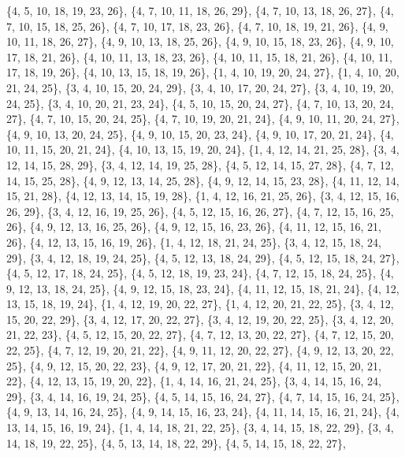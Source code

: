 \documentclass[11pt,a4paper]{article}
\begin{document}
{\{4, 5, 10, 18, 19, 23, 26\}, \{4, 7, 10, 11, 18, 26, 29\}, \{4, 7, 10, 13, 18, 26, 27\}, \{4, 7, 10, 15, 18, 25, 26\}, \{4, 7, 10, 17, 18, 23, 26\},
\{4, 7, 10, 18, 19, 21, 26\}, \{4, 9, 10, 11, 18, 26, 27\}, \{4, 9, 10, 13, 18, 25, 26\}, \{4, 9, 10, 15, 18, 23, 26\}, \{4, 9, 10, 17, 18, 21, 26\},
\{4, 10, 11, 13, 18, 23, 26\}, \{4, 10, 11, 15, 18, 21, 26\}, \{4, 10, 11, 17, 18, 19, 26\}, \{4, 10, 13, 15, 18, 19, 26\}, \{1, 4, 10, 19, 20, 24, 27\},
\{1, 4, 10, 20, 21, 24, 25\}, \{3, 4, 10, 15, 20, 24, 29\}, \{3, 4, 10, 17, 20, 24, 27\}, \{3, 4, 10, 19, 20, 24, 25\}, \{3, 4, 10, 20, 21, 23, 24\},
\{4, 5, 10, 15, 20, 24, 27\}, \{4, 7, 10, 13, 20, 24, 27\}, \{4, 7, 10, 15, 20, 24, 25\}, \{4, 7, 10, 19, 20, 21, 24\}, \{4, 9, 10, 11, 20, 24, 27\},
\{4, 9, 10, 13, 20, 24, 25\}, \{4, 9, 10, 15, 20, 23, 24\}, \{4, 9, 10, 17, 20, 21, 24\}, \{4, 10, 11, 15, 20, 21, 24\}, \{4, 10, 13, 15, 19, 20, 24\},
\{1, 4, 12, 14, 21, 25, 28\}, \{3, 4, 12, 14, 15, 28, 29\}, \{3, 4, 12, 14, 19, 25, 28\}, \{4, 5, 12, 14, 15, 27, 28\}, \{4, 7, 12, 14, 15, 25, 28\},
\{4, 9, 12, 13, 14, 25, 28\}, \{4, 9, 12, 14, 15, 23, 28\}, \{4, 11, 12, 14, 15, 21, 28\}, \{4, 12, 13, 14, 15, 19, 28\}, \{1, 4, 12, 16, 21, 25, 26\},
\{3, 4, 12, 15, 16, 26, 29\}, \{3, 4, 12, 16, 19, 25, 26\}, \{4, 5, 12, 15, 16, 26, 27\}, \{4, 7, 12, 15, 16, 25, 26\}, \{4, 9, 12, 13, 16, 25, 26\},
\{4, 9, 12, 15, 16, 23, 26\}, \{4, 11, 12, 15, 16, 21, 26\}, \{4, 12, 13, 15, 16, 19, 26\}, \{1, 4, 12, 18, 21, 24, 25\}, \{3, 4, 12, 15, 18, 24, 29\},
\{3, 4, 12, 18, 19, 24, 25\}, \{4, 5, 12, 13, 18, 24, 29\}, \{4, 5, 12, 15, 18, 24, 27\}, \{4, 5, 12, 17, 18, 24, 25\}, \{4, 5, 12, 18, 19, 23, 24\},
\{4, 7, 12, 15, 18, 24, 25\}, \{4, 9, 12, 13, 18, 24, 25\}, \{4, 9, 12, 15, 18, 23, 24\}, \{4, 11, 12, 15, 18, 21, 24\}, \{4, 12, 13, 15, 18, 19, 24\},
\{1, 4, 12, 19, 20, 22, 27\}, \{1, 4, 12, 20, 21, 22, 25\}, \{3, 4, 12, 15, 20, 22, 29\}, \{3, 4, 12, 17, 20, 22, 27\}, \{3, 4, 12, 19, 20, 22, 25\},
\{3, 4, 12, 20, 21, 22, 23\}, \{4, 5, 12, 15, 20, 22, 27\}, \{4, 7, 12, 13, 20, 22, 27\}, \{4, 7, 12, 15, 20, 22, 25\}, \{4, 7, 12, 19, 20, 21, 22\},
\{4, 9, 11, 12, 20, 22, 27\}, \{4, 9, 12, 13, 20, 22, 25\}, \{4, 9, 12, 15, 20, 22, 23\}, \{4, 9, 12, 17, 20, 21, 22\}, \{4, 11, 12, 15, 20, 21, 22\},
\{4, 12, 13, 15, 19, 20, 22\}, \{1, 4, 14, 16, 21, 24, 25\}, \{3, 4, 14, 15, 16, 24, 29\}, \{3, 4, 14, 16, 19, 24, 25\}, \{4, 5, 14, 15, 16, 24, 27\},
\{4, 7, 14, 15, 16, 24, 25\}, \{4, 9, 13, 14, 16, 24, 25\}, \{4, 9, 14, 15, 16, 23, 24\}, \{4, 11, 14, 15, 16, 21, 24\}, \{4, 13, 14, 15, 16, 19, 24\},
\{1, 4, 14, 18, 21, 22, 25\}, \{3, 4, 14, 15, 18, 22, 29\}, \{3, 4, 14, 18, 19, 22, 25\}, \{4, 5, 13, 14, 18, 22, 29\}, \{4, 5, 14, 15, 18, 22, 27\},
}
\end{document}
